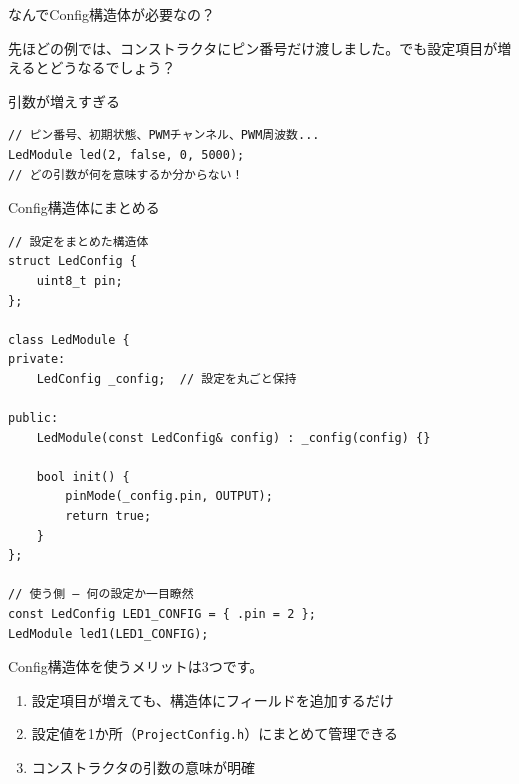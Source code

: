 \begin{qabox}{なんでConfig構造体が必要なの？}

先ほどの例では、コンストラクタにピン番号だけ渡しました。でも設定項目が増えるとどうなるでしょう？

\begin{badexample}{引数が増えすぎる}
\begin{lstlisting}
// ピン番号、初期状態、PWMチャンネル、PWM周波数...
LedModule led(2, false, 0, 5000);
// どの引数が何を意味するか分からない！
\end{lstlisting}
\end{badexample}

\begin{goodexample}{Config構造体にまとめる}
\begin{lstlisting}
// 設定をまとめた構造体
struct LedConfig {
    uint8_t pin;
};

class LedModule {
private:
    LedConfig _config;  // 設定を丸ごと保持

public:
    LedModule(const LedConfig& config) : _config(config) {}

    bool init() {
        pinMode(_config.pin, OUTPUT);
        return true;
    }
};

// 使う側 — 何の設定か一目瞭然
const LedConfig LED1_CONFIG = { .pin = 2 };
LedModule led1(LED1_CONFIG);
\end{lstlisting}
\end{goodexample}

Config構造体を使うメリットは3つです。

\begin{enumerate}
  \item 設定項目が増えても、構造体にフィールドを追加するだけ
  \item 設定値を1か所（\texttt{ProjectConfig.h}）にまとめて管理できる
  \item コンストラクタの引数の意味が明確
\end{enumerate}

\end{qabox}

